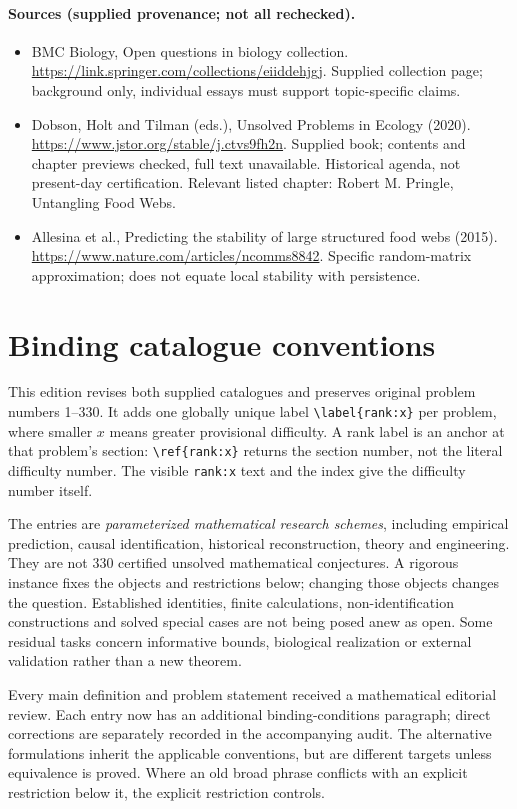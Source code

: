 \documentclass[11pt]{article}
\begin{document}
\paragraph{Sources (supplied provenance; not all rechecked).}
\begin{itemize}
\item BMC Biology, Open questions in biology collection. \url{https://link.springer.com/collections/eiiddehjgj}. Supplied collection page; background only, individual essays must support topic-specific claims.
\item Dobson, Holt and Tilman (eds.), Unsolved Problems in Ecology (2020). \url{https://www.jstor.org/stable/j.ctvs9fh2n}. Supplied book; contents and chapter previews checked, full text unavailable. Historical agenda, not present-day certification. Relevant listed chapter: Robert M. Pringle, Untangling Food Webs.
\item Allesina et al., Predicting the stability of large structured food webs (2015). \url{https://www.nature.com/articles/ncomms8842}. Specific random-matrix approximation; does not equate local stability with persistence.
\end{itemize}


\section*{Binding catalogue conventions}
This edition revises both supplied catalogues and preserves original problem numbers 1--330. It adds one globally unique label \verb|\label{rank:x}| per problem, where smaller $x$ means greater provisional difficulty. A rank label is an anchor at that problem's section: \verb|\ref{rank:x}| returns the section number, not the literal difficulty number. The visible \texttt{rank:x} text and the index give the difficulty number itself.

The entries are \emph{parameterized mathematical research schemes}, including empirical prediction, causal identification, historical reconstruction, theory and engineering. They are not 330 certified unsolved mathematical conjectures. A rigorous instance fixes the objects and restrictions below; changing those objects changes the question. Established identities, finite calculations, non-identification constructions and solved special cases are not being posed anew as open. Some residual tasks concern informative bounds, biological realization or external validation rather than a new theorem.

Every main definition and problem statement received a mathematical editorial review. Each entry now has an additional binding-conditions paragraph; direct corrections are separately recorded in the accompanying audit. The alternative formulations inherit the applicable conventions, but are different targets unless equivalence is proved. Where an old broad phrase conflicts with an explicit restriction below it, the explicit restriction controls.
\end{document}
